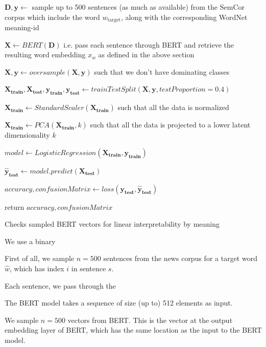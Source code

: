 \documentclass[a4paper,12pt,twoside,openright]{report}
\begin{document}
\begin{algorithm}[H]
\SetAlgoLined
{}
 $\mathbf{D}, \mathbf{y} \leftarrow $  sample up to 500 sentences (as much as available) from the SemCor corpus which include the word $w_{\text{target}}$, along with the corresponding WordNet meaning-id\;

$ \mathbf{X} \leftarrow BERT( \mathbf{D} )$ i.e. pass each sentence through BERT and retrieve the resulting word embedding $x_w$ as defined in the above section\;
 
$ \mathbf{X}, \mathbf{y} \leftarrow oversample( \mathbf{X}, \mathbf{y} )$ such that we don't have dominating classes\;
 
$ \mathbf{X_\text{train}}, \mathbf{X_\text{test}}, \mathbf{y_\text{train}}, \mathbf{y_\text{test}} \leftarrow trainTestSplit( \mathbf{X}, \mathbf{y}, testProportion=0.4 )$ \;

$ \mathbf{X_\text{train}} \leftarrow StandardScaler( \mathbf{X_\text{train}})$ such that all the data is normalized\;

$ \mathbf{X_\text{train}} \leftarrow PCA( \mathbf{X_\text{train}}, k )$ such that all the data is projected to a lower latent dimensionality $k$\;

$ model \leftarrow LogisticRegression( \mathbf{X_\text{train}}, \mathbf{y_\text{train}} )$ \;
    
$ \mathbf{\hat{y}_\text{test}} \leftarrow model.predict(\mathbf{X_\text{test}})$ \;

$ accuracy, confusionMatrix \leftarrow loss(\mathbf{y_\text{test}}, \mathbf{\hat{y}_\text{test}}) $ \;
    
return $ accuracy, confusionMatrix $\;
    
 \caption{Checks sampled BERT vectors for linear interpretability by meaning}
\end{algorithm}

We use a binary 

First of all, we sample $n=500$ sentences from the news corpus for a target word $\hat{w}$, which has index $i$ in sentence $s$.

Each sentence, we pass through the 

The BERT model takes a sequence of size (up to) 512 elements as input.

We sample $n=500$ vectors from BERT.
This is the vector at the output embedding layer of BERT, which has the same location as the input to the BERT model.
\end{document}
